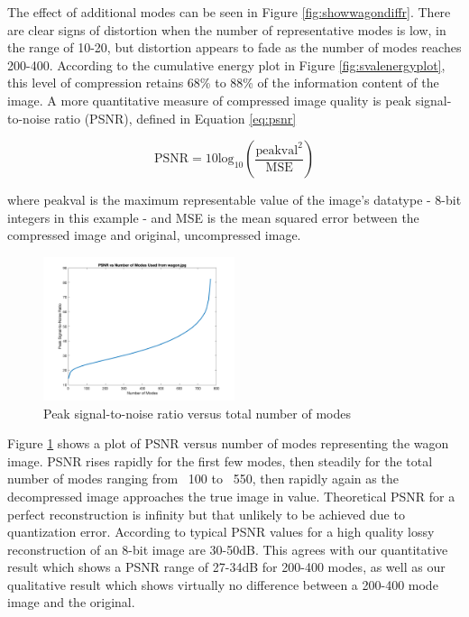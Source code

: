 \documentclass[conference]{IEEEtran}
\begin{document}
    The effect of additional modes can be seen in Figure \ref{fig:showwagondiffr}. There are clear signs of distortion when the number of representative modes is low, in the range of 10-20, but distortion appears to fade as the number of modes reaches 200-400. According to the cumulative energy plot in Figure \ref{fig:svalenergyplot}, this level of compression retains 68\% to 88\% of the information content of the image. A more quantitative measure of compressed image quality is peak signal-to-noise ratio (PSNR), defined in Equation \ref{eq:psnr}

    \begin{equation}
    		\text{PSNR} = 10\text{log}_{10}\left(\frac{\text{peakval}^2}{\text{MSE}}\right)
    \label{eq:psnr}
    \end{equation}

    where peakval is the maximum representable value of the image's datatype - 8-bit integers in this example - and MSE is the mean squared error between the compressed image and original, uncompressed image.

	\begin{figure}[t]
        \includegraphics[width=0.5\textwidth]{snrvsr_wagon_rgb}
        \caption{Peak signal-to-noise ratio versus total number of modes}
        \label{fig:psnrvsr_wagon}
    \end{figure}
    
    Figure \ref{fig:psnrvsr_wagon} shows a plot of PSNR versus number of modes representing the wagon image. PSNR rises rapidly for the first few modes, then steadily for the total number of modes ranging from ~100 to ~550, then rapidly again as the decompressed image approaches the true image in value. Theoretical PSNR for a perfect reconstruction is infinity but that unlikely to be achieved due to quantization error. According to \cite{psnr_quality} typical PSNR values for a high quality lossy reconstruction of an 8-bit image are 30-50dB. This agrees with our quantitative result which shows a PSNR range of 27-34dB for 200-400 modes, as well as our qualitative result which shows virtually no difference between a 200-400 mode image and the original.
\end{document}
